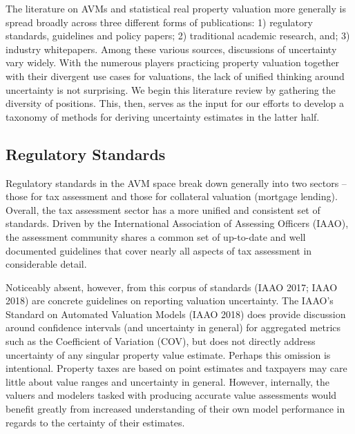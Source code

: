 \documentclass[colTwo]{anon}
\theoremstyle{definition}
\begin{document}
The literature on AVMs and statistical real property valuation more generally is spread broadly across three different forms of publications: 1) regulatory standards, guidelines and policy papers; 2) traditional academic research, and; 3) industry whitepapers.  Among these various sources, discussions of uncertainty vary widely.  With the numerous players practicing property valuation together with their divergent use cases for valuations, the lack of unified thinking around uncertainty is not surprising.  We begin this literature review by gathering the diversity of positions.  This, then, serves as the input for our efforts to develop a taxonomy of methods for deriving uncertainty estimates in the latter half.     

\subsection{Regulatory Standards}

Regulatory standards in the AVM space break down generally into two sectors -- those for tax assessment and those for collateral valuation (mortgage lending).  Overall, the tax assessment sector has a more unified and consistent set of standards.  Driven by the International Association of Assessing Officers (IAAO), the assessment community shares a common set of up-to-date and well documented guidelines that cover nearly all aspects of tax assessment in considerable detail.  

Noticeably absent, however, from this corpus of standards (IAAO 2017; IAAO 2018) are concrete guidelines on reporting valuation uncertainty.  The IAAO’s Standard on Automated Valuation Models (IAAO 2018) does provide discussion around confidence intervals (and uncertainty in general) for aggregated metrics such as the Coefficient of Variation (COV), but does not directly address uncertainty of any singular property value estimate.  Perhaps this omission is intentional.  Property taxes are based on point estimates and taxpayers may care little about value ranges and uncertainty in general.  However, internally, the valuers and modelers tasked with producing accurate value assessments would benefit greatly from increased understanding of their own model performance in regards to the certainty of their estimates.		
\end{document}
